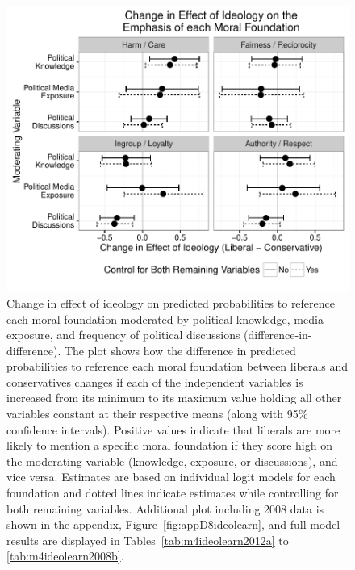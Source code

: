 \documentclass[12pt]{article}
\begin{document}
\begin{figure}[h]\centering
\includegraphics[scale=.9]{../calc/fig/fig4ideolearn.pdf}
\caption{Change in effect of ideology on predicted probabilities to reference each moral foundation moderated by political knowledge, media exposure, and frequency of political discussions (difference-in-difference). The plot shows how the difference in predicted probabilities to reference each moral foundation between liberals and conservatives changes if each of the independent variables is increased from its minimum to its maximum value holding all other variables constant at their respective means (along with 95\% confidence intervals). Positive values indicate that liberals are more likely to mention a specific moral foundation if they score high on the moderating variable (knowledge, exposure, or discussions), and vice versa. Estimates are based on individual logit models for each foundation and dotted lines indicate estimates while controlling for both remaining variables. Additional plot including 2008 data is shown in the appendix, Figure~\ref{fig:appD8ideolearn}, and full model results are displayed in Tables~\ref{tab:m4ideolearn2012a} to \ref{tab:m4ideolearn2008b}.}\label{fig:4ideolearn}
\end{figure}
\end{document}
